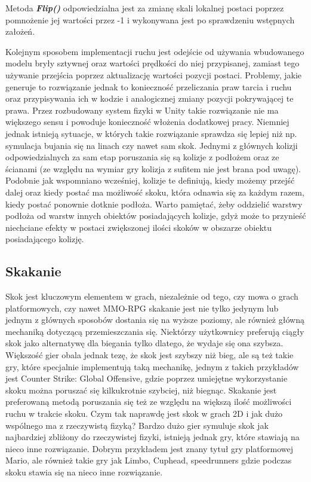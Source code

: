 \documentclass[oneside,polski,logo]{amuthesis}
\begin{document}
Metoda \textbf{\textit{Flip()}} odpowiedzialna jest za zmianę skali lokalnej postaci poprzez pomnożenie jej wartości przez -1 i wykonywana jest po sprawdzeniu wstępnych założeń.

Kolejnym sposobem implementacji ruchu jest odejście od używania wbudowanego modelu bryły sztywnej oraz wartości prędkości do niej przypisanej, zamiast tego używanie przejścia poprzez aktualizację wartości pozycji postaci. Problemy, jakie generuje to rozwiązanie jednak to konieczność przeliczania praw tarcia i ruchu oraz przypisywania ich w kodzie i analogicznej zmiany pozycji pokrywającej te prawa. Przez rozbudowany system fizyki w Unity takie rozwiązanie nie ma większego sensu i powoduje konieczność włożenia dodatkowej pracy. Niemniej jednak istnieją sytuacje, w których takie rozwiązanie sprawdza się lepiej niż np. symulacja bujania się na linach czy nawet sam skok.
Jednymi z głównych kolizji odpowiedzialnych za sam etap poruszania się są kolizje z podłożem oraz ze ścianami (ze względu na wymiar gry kolizja z sufitem nie jest brana pod uwagę). Podobnie jak wspomniano wcześniej, kolizje te definiują, kiedy możemy przejść dalej oraz kiedy postać ma możliwość skoku, która odnawia się za każdym razem, kiedy postać ponownie dotknie podłoża. Warto pamiętać, żeby oddzielić warstwy podłoża od warstw innych obiektów posiadających kolizje, gdyż może to przynieść niechciane efekty w postaci zwiększonej ilości skoków w obszarze obiektu posiadającego kolizję.

\subsection{Skakanie} 
Skok jest kluczowym elementem w grach, niezależnie od tego, czy mowa o grach platformowych, czy nawet MMO-RPG skakanie jest nie tylko jedynym lub jednym z głównych sposobów dostania się na wyższe poziomy, ale również główną mechaniką dotyczącą przemieszczania się. Niektórzy użytkownicy preferują ciągły skok jako alternatywę dla biegania tylko dlatego, że wydaje się ona szybsza. Większość gier obala jednak tezę, że skok jest szybszy niż bieg, ale są też takie gry, które specjalnie implementują taką mechanikę, jednym z takich przykładów jest Counter Strike: Global Offensive, gdzie poprzez umiejętne wykorzystanie skoku można poruszać się kilkukrotnie szybciej, niż biegnąc. Skakanie jest preferowaną metodą poruszania się też ze względu na większą ilość możliwości ruchu w trakcie skoku.
Czym tak naprawdę jest skok w grach 2D i jak dużo wspólnego ma z rzeczywistą fizyką? Bardzo dużo gier symuluje skok jak najbardziej zbliżony do rzeczywistej fizyki, istnieją jednak gry, które stawiają na nieco inne rozwiązanie. Dobrym przykładem jest znany tytuł gry platformowej Mario, ale również takie gry jak Limbo, Cuphead, speedrunners gdzie podczas skoku stawia się na nieco inne rozwiązanie. \cite{jumping1} 
\end{document}
